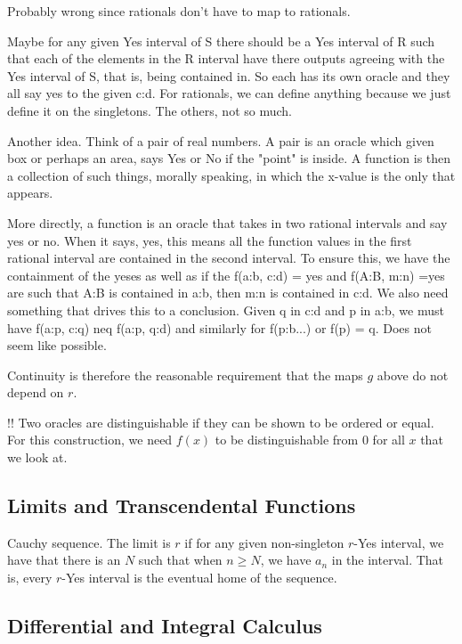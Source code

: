 \documentclass[12pt]{article}
\theoremstyle{remark}
\begin{document}
Probably wrong since rationals don't have to map to rationals. 

Maybe for any given Yes interval of S there should be a Yes interval of R such that each of the elements in the R interval have there outputs agreeing with the Yes interval of S, that is, being contained in. So each has its own oracle and they all say yes to the given c:d.  For rationals, we can define anything because we just define it on the singletons. The others, not so much. 


Another idea. Think of a pair of real numbers. A pair is an oracle which given box or perhaps an area, says Yes or No if the "point" is inside. A function is then a collection of such things, morally speaking, in which the x-value is the only that appears. 

More directly, a function is an oracle that takes in two rational intervals  and say yes or no. When it says, yes, this means all the function values in the first rational interval are contained in the second interval. To ensure this, we have the containment of the yeses as well as if the f(a:b, c:d) = yes and f(A:B, m:n) =yes are such that A:B is contained in a:b, then m:n is contained in c:d. We also need something that drives this to a conclusion. Given q in c:d and p in a:b, we must have f(a:p, c:q) neq f(a:p, q:d) and similarly for f(p:b...) or  f(p) = q. Does not seem like possible. 


Continuity is therefore the reasonable requirement that the maps $g$ above do not depend on $r$. 

!! Two oracles are distinguishable if they can be shown to be ordered or equal. For this construction, we need $f(x)$ to be distinguishable from 0 for all $x$ that we look at. 


\subsection{Limits and Transcendental Functions}

Cauchy sequence. The limit is $r$ if for any given non-singleton $r$-Yes interval, we have that there is an $N$ such that  when $n \geq N$, we have $a_n$ in the interval.  That is, every $r$-Yes interval is the eventual home of the sequence. 


\subsection{Differential and Integral Calculus}
\end{document}
